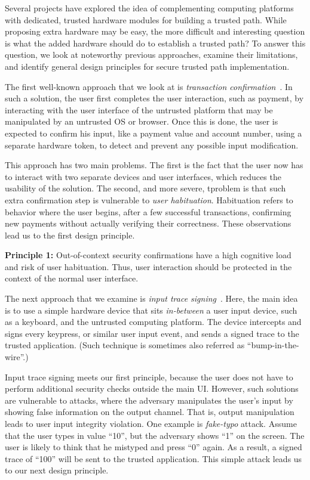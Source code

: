 Several projects have explored the idea of complementing computing platforms with dedicated, trusted hardware modules for building a trusted path. While proposing extra hardware may be easy, the more difficult and interesting question is what the added hardware should do to establish a trusted path? To answer this question, we look at noteworthy previous approaches, examine their limitations, and identify general design principles for secure trusted path implementation.
    
The first well-known approach that we look at is \emph{transaction confirmation}~\cite{filyanov2011uni}. In such a solution, the user first completes the user interaction, such as payment, by interacting with the user interface of the untrusted platform that may be manipulated by an untrusted OS or browser. Once this is done, the user is expected to confirm his input, like a payment value and account number, using a separate hardware token, to detect and prevent any possible input modification.

This approach has two main problems. The first is the fact that the user now has to interact with two separate devices and user interfaces, which reduces the usability of the solution. The second, and more severe, tproblem is that such extra confirmation step is vulnerable to \emph{user habituation}. Habituation refers to behavior where the user begins, after a few successful transactions, confirming new payments without actually verifying their correctness. These observations lead us to the first design principle.  

\begin{tcolorbox}
\textbf{Principle 1:} Out-of-context security confirmations have a high cognitive load and risk of user habituation. Thus, user interaction should be protected in the context of the normal user interface.
\end{tcolorbox}

The next approach that we examine is \emph{input trace signing}~\cite{IntegriKey}. Here, the main idea is to use a simple hardware device that sits \emph{in-between} a user input device, such as a keyboard, and the untrusted computing platform. The device intercepts and signs every keypress, or similar user input event, and sends a signed trace to the trusted application. (Such technique is sometimes also referred as ``bump-in-the-wire''.)%

Input trace signing meets our first principle, because the user does not have to perform additional security checks outside the main UI. However, such solutions are vulnerable to attacks, where the adversary manipulates the user's input by showing false information on the output channel. That is, output manipulation leads to user input integrity violation. One example is \emph{fake-typo} attack. Assume that the user types in value ``10'', but the adversary shows ``1'' on the screen. The user is likely to think that he mistyped and press ``0'' again. As a result, a signed trace of ``100'' will be sent to the trusted application. This simple attack leads us to our next design principle.

